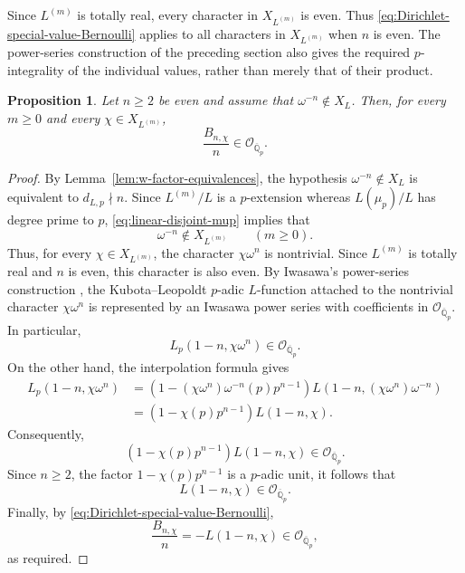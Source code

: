\documentclass[11pt,table]{amsart}
\newtheorem{proposition}[theorem]{Proposition}
\numberwithin{equation}{section}
\begin{document}
\par Since \(L^{(m)}\) is totally real, every character in
\(X_{L^{(m)}}\) is even. Thus
\eqref{eq:Dirichlet-special-value-Bernoulli} applies to all characters
in \(X_{L^{(m)}}\) when \(n\) is even. The power-series construction
of the preceding section also gives the required \(p\)-integrality of
the individual values, rather than merely that of their product.

\begin{proposition}
\label{prop:Bernoulli-integrality}
Let \(n\geq 2\) be even and assume that
\(\omega^{-n}\notin X_L\). Then, for every \(m\geq 0\) and every
\(\chi\in X_{L^{(m)}}\),
\begin{equation}
        \frac{B_{n,\chi}}{n}
        \in
        \mathcal O_{\overline{\mathbb Q}_p}.
        \label{eq:Bernoulli-integrality}
\end{equation}
\end{proposition}

\begin{proof}
By Lemma~\ref{lem:w-factor-equivalences}, the hypothesis
\(\omega^{-n}\notin X_L\) is equivalent to \(d_{L,p}\nmid n\).
Since \(L^{(m)}/L\) is a \(p\)-extension whereas
\(L(\mu_p)/L\) has degree prime to \(p\),
\eqref{eq:linear-disjoint-mup} implies that
\[
        \omega^{-n}\notin X_{L^{(m)}}
        \qquad(m\geq0).
\]
Thus, for every \(\chi\in X_{L^{(m)}}\), the character
\(\chi\omega^n\) is nontrivial.  Since \(L^{(m)}\) is totally real and
\(n\) is even, this character is also even.  By Iwasawa's
power-series construction
\cite[Theorem~7.10]{Washington1997}, the Kubota--Leopoldt
\(p\)-adic \(L\)-function attached to the nontrivial character
\(\chi\omega^n\) is represented by an Iwasawa power series with
coefficients in
\(\mathcal O_{\overline{\mathbb Q}_p}\).  In particular,
\[
        L_p(1-n,\chi\omega^n)
        \in
        \mathcal O_{\overline{\mathbb Q}_p}.
\]
On the other hand, the interpolation formula
\cite[Theorem~5.11]{Washington1997} gives
\[
\begin{aligned}
        L_p(1-n,\chi\omega^n)
        &=
        \left(
        1-(\chi\omega^n)\omega^{-n}(p)p^{n-1}
        \right)
        L\left(1-n,(\chi\omega^n)\omega^{-n}\right)\\
        &=
        \left(1-\chi(p)p^{n-1}\right)L(1-n,\chi).
\end{aligned}
\]
Consequently,
\[
        \left(1-\chi(p)p^{n-1}\right)L(1-n,\chi)
        \in
        \mathcal O_{\overline{\mathbb Q}_p}.
\]
Since \(n\geq2\), the factor $1-\chi(p)p^{n-1}$
is a \(p\)-adic unit, it follows that
\[
        L(1-n,\chi)
        \in
        \mathcal O_{\overline{\mathbb Q}_p}.
\]
Finally, by \eqref{eq:Dirichlet-special-value-Bernoulli},
\[
        \frac{B_{n,\chi}}{n}
        =
        -L(1-n,\chi)
        \in
        \mathcal O_{\overline{\mathbb Q}_p},
\]
as required.
\end{proof}
\end{document}
